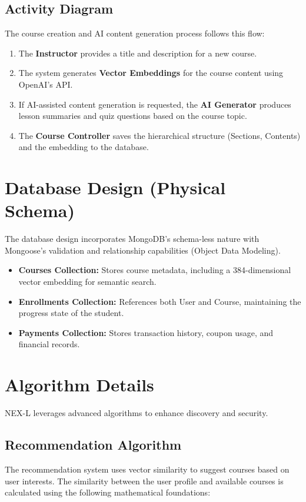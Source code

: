 \subsection{Activity Diagram}
The course creation and AI content generation process follows this flow:
\begin{enumerate}
    \item The \textbf{Instructor} provides a title and description for a new course.
    \item The system generates \textbf{Vector Embeddings} for the course content using OpenAI's API.
    \item If AI-assisted content generation is requested, the \textbf{AI Generator} produces lesson summaries and quiz questions based on the course topic.
    \item The \textbf{Course Controller} saves the hierarchical structure (Sections, Contents) and the embedding to the database.
\end{enumerate}

\section{Database Design (Physical Schema)}
The database design incorporates MongoDB's schema-less nature with Mongoose's validation and relationship capabilities (Object Data Modeling).
\begin{itemize}
    \item \textbf{Courses Collection:} Stores course metadata, including a 384-dimensional vector embedding for semantic search.
    \item \textbf{Enrollments Collection:} References both User and Course, maintaining the progress state of the student.
    \item \textbf{Payments Collection:} Stores transaction history, coupon usage, and financial records.
\end{itemize}

\section{Algorithm Details}
\label{sec:algorithm_details}
NEX-L leverages advanced algorithms to enhance discovery and security.

\subsection{Recommendation Algorithm}
The recommendation system uses vector similarity to suggest courses based on user interests. The similarity between the user profile and available courses is calculated using the following mathematical foundations:

